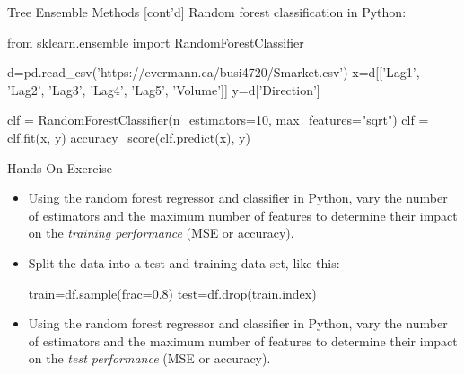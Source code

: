 \documentclass[ignorenonframetext,xcolor=x11names]{beamer}
\begin{document}
\begin{frame}[fragile]{Tree Ensemble Methods \small [cont'd]}
Random forest classification in Python:

\begin{pythoncode}
from sklearn.ensemble import RandomForestClassifier

d=pd.read_csv('https://evermann.ca/busi4720/Smarket.csv')
x=d[['Lag1', 'Lag2', 'Lag3', 'Lag4', 'Lag5', 'Volume']]
y=d['Direction']
\end{pythoncode}

\begin{pythoncode}
clf = RandomForestClassifier(n_estimators=10, 
                             max_features="sqrt")
clf = clf.fit(x, y)
accuracy_score(clf.predict(x), y)
\end{pythoncode}
\end{frame}

\begin{frame}[fragile]{Hands-On Exercise}
\begin{itemize}
\item Using the random forest regressor and classifier in Python, vary the number of estimators and the maximum number of features to determine their impact on the \emph{training performance} (MSE or accuracy).
\item Split the data into a test and training data set, like this:
\begin{pythoncode}
train=df.sample(frac=0.8)
test=df.drop(train.index)
\end{pythoncode}
\item Using the random forest regressor and classifier in Python, vary the number of estimators and the maximum number of features to determine their impact on the \emph{test performance} (MSE or accuracy).
\end{itemize}
\end{frame}
\end{document}
